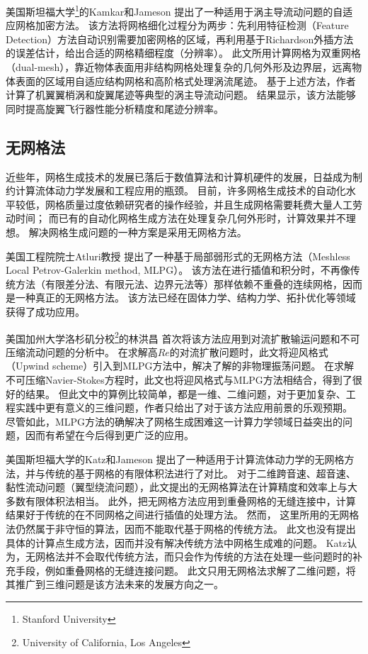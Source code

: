 美国斯坦福大学\footnote{Stanford University}的Kamkar和Jameson
提出了一种适用于涡主导流动问题的自适应网格加密方法。
该方法将网格细化过程分为两步：先利用特征检测（Feature Detection）方法自动识别需要加密网格的区域，再利用基于Richardson外插方法的误差估计，给出合适的网格精细程度（分辨率）。
此文所用计算网格为双重网格（dual-mesh），靠近物体表面用非结构网格处理复杂的几何外形及边界层，远离物体表面的区域用自适应结构网格和高阶格式处理涡流尾迹。
基于上述方法，作者计算了机翼翼梢涡和旋翼尾迹等典型的涡主导流动问题。
结果显示，该方法能够同时提高旋翼飞行器性能分析精度和尾迹分辨率。

\subsection{无网格法}
近些年，网格生成技术的发展已落后于数值算法和计算机硬件的发展，日益成为制约计算流体动力学发展和工程应用的瓶颈。
目前，许多网格生成技术的自动化水平较低，网格质量过度依赖研究者的操作经验，并且生成网格需要耗费大量人工劳动时间；
而已有的自动化网格生成方法在处理复杂几何外形时，计算效果并不理想。
解决网格生成问题的一种方案是采用无网格方法。

美国工程院院士Atluri教授
提出了一种基于局部弱形式的无网格方法（Meshless Local Petrov-Galerkin method, MLPG）。
该方法在进行插值和积分时，不再像传统方法（有限差分法、有限元法、边界元法等）那样依赖不重叠的连续网格，因而是一种真正的无网格方法。
该方法已经在固体力学、结构力学、拓扑优化等领域获得了成功应用。

美国加州大学洛杉矶分校\footnote{University of California, Los Angeles}的林洪昌
首次将该方法应用到对流扩散输运问题和不可压缩流动问题的分析中。
在求解高$Re$的对流扩散问题时，此文将迎风格式（Upwind scheme）引入到MLPG方法中，解决了解的非物理振荡问题。
在求解不可压缩Navier-Stokes方程时，此文也将迎风格式与MLPG方法相结合，得到了很好的结果。
但此文中的算例比较简单，都是一维、二维问题，对于更加复杂、工程实践中更有意义的三维问题，作者只给出了对于该方法应用前景的乐观预期。
尽管如此，MLPG方法的确解决了网格生成困难这一计算力学领域日益突出的问题，因而有希望在今后得到更广泛的应用。

美国斯坦福大学的Katz和Jameson
提出了一种适用于计算流体动力学的无网格方法，并与传统的基于网格的有限体积法进行了对比。
对于二维跨音速、超音速、黏性流动问题（翼型绕流问题），此文提出的无网格算法在计算精度和效率上与大多数有限体积法相当。
此外，把无网格方法应用到重叠网格的无缝连接中，计算结果好于传统的在不同网格之间进行插值的处理方法。
然而， 这里所用的无网格法仍然属于非守恒的算法，因而不能取代基于网格的传统方法。
此文也没有提出具体的计算点生成方法，因而并没有解决传统方法中网格生成难的问题。
Katz认为，无网格法并不会取代传统方法，而只会作为传统的方法在处理一些问题时的补充手段，例如重叠网格的无缝连接问题。
此文只用无网格法求解了二维问题，将其推广到三维问题是该方法未来的发展方向之一。

